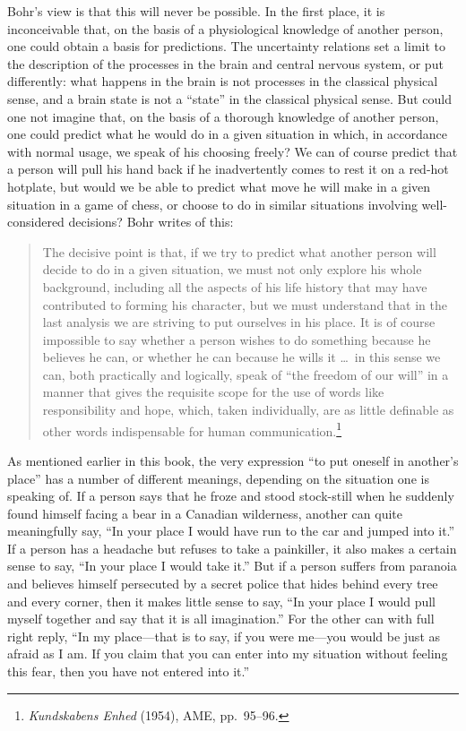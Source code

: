 \documentclass[12pt,a4paper]{book}
\begin{document}
Bohr's view is that this will never be possible. In the first place, it is inconceivable that, on the basis of a physiological knowledge of another person, one could obtain a basis for predictions. The uncertainty relations set a limit to the description of the processes in the brain and central nervous system, or put differently: what happens in the brain is not processes in the classical physical sense, and a brain state is not a ``state'' in the classical physical sense. But could one not imagine that, on the basis of a thorough knowledge of another person, one could predict what he would do in a given situation in which, in accordance with normal usage, we speak of his choosing freely? We can of course predict that a person will pull his hand back if he inadvertently comes to rest it on a red-hot hotplate, but would we be able to predict what move he will make in a given situation in a game of chess, or choose to do in similar situations involving well-considered decisions? Bohr writes of this:

\begin{quote}
The decisive point is that, if we try to predict what another person will decide to do in a given situation, we must not only explore his whole background, including all the aspects of his life history that may have contributed to forming his character, but we must understand that in the last analysis we are striving to put ourselves in his place. It is of course impossible to say whether a person wishes to do something because he believes he can, or whether he can because he wills it \dots\ in this sense we can, both practically and logically, speak of ``the freedom of our will'' in a manner that gives the requisite scope for the use of words like responsibility and hope, which, taken individually, are as little definable as other words indispensable for human communication.\footnote{\emph{Kundskabens Enhed} (1954), AME, pp.~95--96.}
\end{quote}

As mentioned earlier in this book, the very expression ``to put oneself in another's place'' has a number of different meanings, depending on the situation one is speaking of. If a person says that he froze and stood stock-still when he suddenly found himself facing a bear in a Canadian wilderness, another can quite meaningfully say, ``In your place I would have run to the car and jumped into it.'' If a person has a headache but refuses to take a painkiller, it also makes a certain sense to say, ``In your place I would take it.'' But if a person suffers from paranoia and believes himself persecuted by a secret police that hides behind every tree and every corner, then it makes little sense to say, ``In your place I would pull myself together and say that it is all imagination.'' For the other can with full right reply, ``In my place---that is to say, if you were me---you would be just as afraid as I am. If you claim that you can enter into my situation without feeling this fear, then you have not entered into it.''
\end{document}
